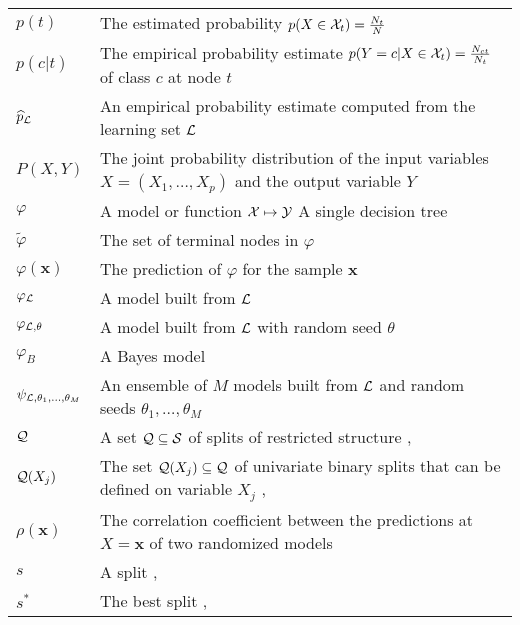 \begin{tabularx}{\textwidth}{ l X }
$p(t)$ & The estimated probability $p(X \in {\cal X}_t)=\tfrac{N_t}{N}$ \dotfill  \pageref{ntn:p_t}\\
$p(c|t)$ & The empirical probability estimate $p(Y=c | X \in {\cal X}_t)=\tfrac{N_{ct}}{N_t}$ of class $c$ at node $t$ \dotfill  \pageref{ntn:p_ct}\\
$\widehat{p}_{\cal L}$ & An empirical probability estimate computed from the learning set ${\cal L}$\dotfill  \pageref{eqn:4:proba-estimates}\\
$P(X,Y)$ & The joint probability distribution of the input variables $X=(X_1,\dots,X_p)$ and the output variable $Y$ \dotfill  \pageref{ntn:P_XY}\\
$\varphi$ & A model or function ${\cal X} \mapsto {\cal Y}$ \dotfill  \pageref{ntn:varphi}\newline A single decision tree \dotfill  \pageref{ntn:tree}\\
$\widetilde{\varphi}$ & The set of terminal nodes in $\varphi$ \dotfill  \pageref{ntn:varphi-leafs}\\
$\varphi(\mathbf{x})$ & The prediction of $\varphi$ for the sample $\mathbf{x}$ \dotfill  \pageref{ntn:varphi-x}\\
$\varphi_{\cal L}$ & A model built from ${\cal L}$ \dotfill  \pageref{ntn:varphi-L}\\
$\varphi_{{\cal L},\theta}$ & A model built from ${\cal L}$ with random seed $\theta$ \dotfill  \pageref{ntn:varphi-Ltheta}\\
$\varphi_B$ & A Bayes model \dotfill  \pageref{ntn:varphi-B}\\
$\psi_{{\cal L},\theta_1,\dots,\theta_M}$ & An ensemble of $M$ models built from ${\cal L}$ and random seeds $\theta_1, \dots, \theta_M$ \dotfill \pageref{ntn:psi} \\
${\cal Q}$ & A set ${\cal Q} \subseteq {\cal S}$ of splits of restricted structure \dotfill \pageref{ntn:Q}, \pageref{ntn:Q2}\\
${\cal Q}(X_j)$ & The set ${\cal Q}(X_j) \subseteq {\cal Q}$ of univariate binary splits that can be defined on variable $X_j$ \dotfill \pageref{eqn:q:ordered}, \pageref{eqn:q:categorical-cart}\\
$\rho(\mathbf{x})$ & The correlation coefficient between the predictions at $X=\mathbf{x}$ of two randomized models \dotfill \pageref{eqn:4:correlation} \\
$s$ & A split \dotfill  \pageref{ntn:s}, \pageref{ntn:s2}\\
$s^*$ & The best split \dotfill  \pageref{ntn:s-star}, \pageref{eqn:best-best-split}\\

\end{tabularx}
